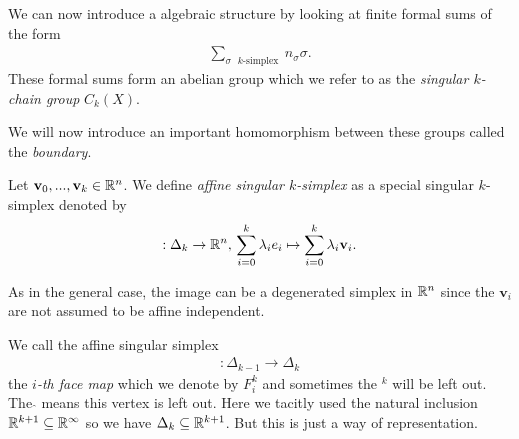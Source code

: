\documentclass[../master_thesis.tex]{subfiles}
\begin{document}
We can now introduce a algebraic structure by looking at finite formal sums of the form 
\begin{align*}
    \sum_{\text{$\sigma$ $k$-simplex }} n_\sigma \sigma.
\end{align*}
These formal sums form an abelian group which we refer to as the 
\textit{singular $k$-chain group} $C_k(X)$. 

We will now introduce an important homomorphism between these groups called the \textit{boundary}.
\begin{definition}
    Let $\mathbf{v}_0, ... , \mathbf{v}_k \in \mathbb{R}^n$. 
    We define \textit{affine singular $k$-simplex} as a special singular $k$-simplex denoted by
    \begin{align*}
        [\mathbf{v}_0,...,\mathbf{v}_k]: \Delta_k \rightarrow \real^n, \, 
        \sum\limits_{i = 0}^k \lambda_i e_i \mapsto \sum\limits_{i = 0}^k \lambda_i \mathbf{v}_i.
    \end{align*}
\end{definition}
As in the general case, the image can be a degenerated simplex in $\mathbb{R}^n$ since the 
$\mathbf{v}_i$ are not assumed to be affine independent. 

We call the affine singular simplex 
\begin{align}
    [e_0,...,\hat{e}_i,...,e_k]: \Delta_{k-1} \rightarrow \Delta_k \label{eq:face_map}
\end{align}
the \textit{$i$-th face map} which we denote by $F^k_i$ and sometimes the $^k$ will be left out. 
The $\hat{ }$ means this vertex is left out. Here we tacitly used the 
natural inclusion $\mathbb{R}^{k+1} \subseteq \mathbb{R}^\infty$ so we have 
$\Delta_k \subseteq \mathbb{R}^{k+1}$. But this is just a way of representation.
\end{document}
